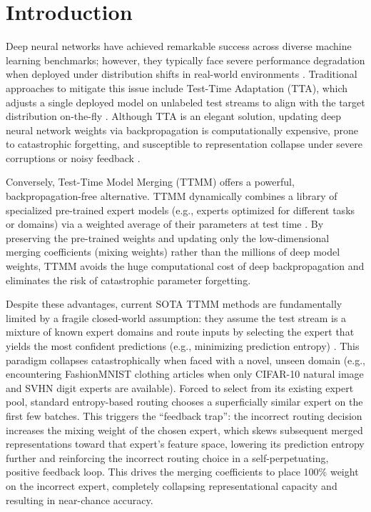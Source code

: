 \documentclass{article}
\theoremstyle{plain}
\theoremstyle{definition}
\theoremstyle{remark}
\begin{document}
\printAffiliationsAndNotice{\icmlEqualContribution}

\section{Introduction}
\label{submission-sec1}
Deep neural networks have achieved remarkable success across diverse machine learning benchmarks; however, they typically face severe performance degradation when deployed under distribution shifts in real-world environments \cite{lecun2015, hendrycks2019}. Traditional approaches to mitigate this issue include Test-Time Adaptation (TTA), which adjusts a single deployed model on unlabeled test streams to align with the target distribution on-the-fly \cite{wang2021b, dobler2023}. Although TTA is an elegant solution, updating deep neural network weights via backpropagation is computationally expensive, prone to catastrophic forgetting, and susceptible to representation collapse under severe corruptions or noisy feedback \cite{gong2022}.

Conversely, Test-Time Model Merging (TTMM) offers a powerful, backpropagation-free alternative. TTMM dynamically combines a library of specialized pre-trained expert models (e.g., experts optimized for different tasks or domains) via a weighted average of their parameters at test time \cite{matena2021, wortsman2022, wang2024}. By preserving the pre-trained weights and updating only the low-dimensional merging coefficients (mixing weights) rather than the millions of deep model weights, TTMM avoids the huge computational cost of deep backpropagation and eliminates the risk of catastrophic parameter forgetting.

Despite these advantages, current SOTA TTMM methods are fundamentally limited by a fragile closed-world assumption: they assume the test stream is a mixture of known expert domains and route inputs by selecting the expert that yields the most confident predictions (e.g., minimizing prediction entropy) \cite{wang2024}. This paradigm collapses catastrophically when faced with a novel, unseen domain (e.g., encountering FashionMNIST clothing articles when only CIFAR-10 natural image and SVHN digit experts are available). Forced to select from its existing expert pool, standard entropy-based routing chooses a superficially similar expert on the first few batches. This triggers the ``feedback trap'': the incorrect routing decision increases the mixing weight of the chosen expert, which skews subsequent merged representations toward that expert's feature space, lowering its prediction entropy further and reinforcing the incorrect routing choice in a self-perpetuating, positive feedback loop. This drives the merging coefficients to place 100\% weight on the incorrect expert, completely collapsing representational capacity and resulting in near-chance accuracy.
\end{document}
